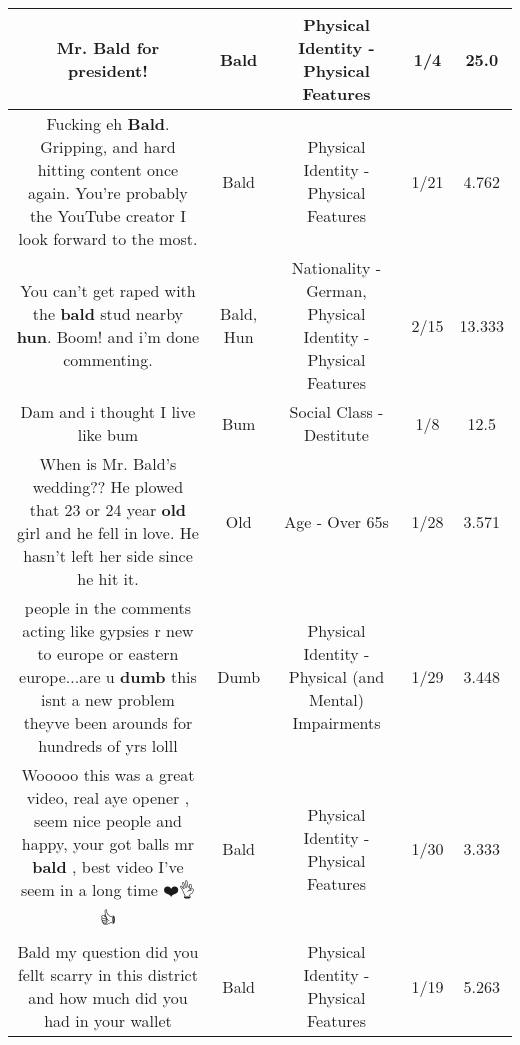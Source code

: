 \documentclass[11pt]{article}
\newlength\mylength
\begin{document}
\begin{center}
\begin{longtable}{|C{.65\mylength}|C{.30\mylength}|C{.12\mylength}|C{.12\mylength}|C{.12\mylength}|}
  \small Mr. \textbf{Bald} for president!\normalsize   & Bald & Physical Identity - Physical Features & 1/4 & 25.0 \\  \hline
  \small Fucking eh \textbf{Bald}. Gripping, and hard hitting content once again. You're probably the YouTube creator I look forward to the most.\normalsize   & Bald & Physical Identity - Physical Features & 1/21 & 4.762 \\  \hline
  \small You can't get raped with the \textbf{bald} stud nearby \textbf{hun}. Boom! and i'm done commenting.\normalsize   & Bald, Hun & Nationality - German, Physical Identity - Physical Features & 2/15 & 13.333 \\  \hline
  \small Dam and i thought I live like bum\normalsize   & Bum & Social Class - Destitute & 1/8 & 12.5 \\  \hline
  \small When is Mr. Bald's wedding?? He plowed that 23 or 24 year \textbf{old} girl and he fell in love. He hasn't left her side since he hit it.\normalsize   & Old & Age - Over 65s & 1/28 & 3.571 \\  \hline
  \small people in the comments acting like gypsies r new to europe or eastern europe...are u \textbf{dumb} this isnt a new problem theyve been arounds for hundreds of yrs lolll\normalsize   & Dumb & Physical Identity - Physical (and Mental) Impairments & 1/29 & 3.448 \\  \hline
  \small Wooooo this was a great video, real aye opener , seem nice people and happy, your got balls mr \textbf{bald} , best video I've seem in a long time ❤️👌👍\normalsize   & Bald & Physical Identity - Physical Features & 1/30 & 3.333 \\  \hline
  \small Bald my question did you fellt scarry in this district and how much did you had in your wallet\normalsize   & Bald & Physical Identity - Physical Features & 1/19 & 5.263 \\  \hline

\end{longtable}
\end{center}
\end{document}

